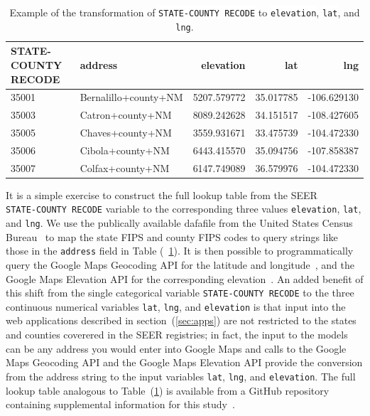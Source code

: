 \documentclass[a4paper,11pt]{article}
\newcommand{\codewhite}[1]{\colorbox{white}{\texttt{#1}}}
\begin{document}
\begin{table}[tbp]
\begin{center}
\begin{tabular}{llrrr}
\toprule
 STATE-COUNTY RECODE &               address &    elevation &        lat &         lng \\
\midrule
35001 &  Bernalillo+county+NM &  5207.579772 &  35.017785 & -106.629130 \\
35003 &      Catron+county+NM &  8089.242628 &  34.151517 & -108.427605 \\
35005 &      Chaves+county+NM &  3559.931671 &  33.475739 & -104.472330 \\
35006 &      Cibola+county+NM &  6443.415570 &  35.094756 & -107.858387 \\
35007 &      Colfax+county+NM &  6147.749089 &  36.579976 & -104.472330 \\
\bottomrule
\end{tabular}
\caption{\label{tab:nmhead} Example of the transformation of \codewhite{STATE-COUNTY RECODE} to \codewhite{elevation}, \codewhite{lat}, and \codewhite{lng}.}
\end{center}
\end{table}

It is a simple exercise to construct the full lookup table from the SEER \\  \codewhite{STATE-COUNTY RECODE} variable to the corresponding three values \codewhite{elevation}, \codewhite{lat}, and \codewhite{lng}. We use the publically available dafafile from the United States Census Bureau~\cite{census} to map the state FIPS and county FIPS codes to query strings like those in the \codewhite{address} field in Table (~\ref{tab:nmhead}). 
It is then possible to programmatically query the Google Maps Geocoding API for the latitude and longitude~\cite{geocode}, and the Google Maps Elevation API for the corresponding elevation~\cite{elevation}.
An added benefit of this shift from the single categorical variable \codewhite{STATE-COUNTY RECODE} to the three continuous numerical variables \codewhite{lat}, \codewhite{lng}, and \codewhite{elevation} is that input into the web applications described in section~(\ref{sec:apps}) are not restricted to the states and counties coverered in the SEER registries; in fact, the input to the models can be any address you would enter into Google Maps and calls to the Google Maps Geocoding API and the Google Maps Elevation API provide the conversion from the address string to the input variables \codewhite{lat}, \codewhite{lng}, and \codewhite{elevation}. The full lookup table analogous to Table~(\ref{tab:nmhead}) is available from a GitHub repository containing supplemental information for this study~\cite{supp}. 
\end{document}
